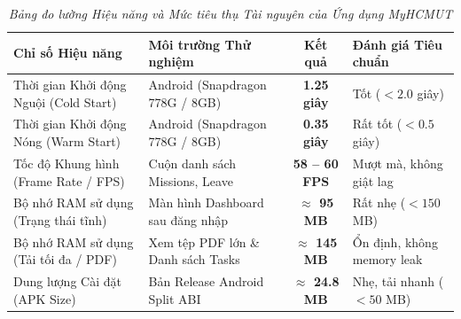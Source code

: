 \begin{table}[H]
\centering
\renewcommand{\arraystretch}{1.2}
\begin{tabularx}{\textwidth}{|p{5.5cm}|p{3.5cm}|c|X|}
\hline
\textbf{Chỉ số Hiệu năng} & \textbf{Môi trường Thử nghiệm} & \textbf{Kết quả} & \textbf{Đánh giá Tiêu chuẩn} \\
\hline
Thời gian Khởi động Nguội (Cold Start) & Android (Snapdragon 778G / 8GB) & \textbf{1.25 giây} & Tốt ($< 2.0$ giây) \\
\hline
Thời gian Khởi động Nóng (Warm Start) & Android (Snapdragon 778G / 8GB) & \textbf{0.35 giây} & Rất tốt ($< 0.5$ giây) \\
\hline
Tốc độ Khung hình (Frame Rate / FPS) & Cuộn danh sách Missions, Leave & \textbf{58 -- 60 FPS} & Mượt mà, không giật lag \\
\hline
Bộ nhớ RAM sử dụng (Trạng thái tĩnh) & Màn hình Dashboard sau đăng nhập & \textbf{$\approx$ 95 MB} & Rất nhẹ ($< 150$ MB) \\
\hline
Bộ nhớ RAM sử dụng (Tải tối đa / PDF) & Xem tệp PDF lớn \& Danh sách Tasks & \textbf{$\approx$ 145 MB} & Ổn định, không memory leak \\
\hline
Dung lượng Cài đặt (APK Size) & Bản Release Android Split ABI & \textbf{$\approx$ 24.8 MB} & Nhẹ, tải nhanh ($< 50$ MB) \\
\hline
\end{tabularx}
\caption{\textit{Bảng đo lường Hiệu năng và Mức tiêu thụ Tài nguyên của Ứng dụng MyHCMUT}}
\label{tab:mobile_perf}
\end{table}
